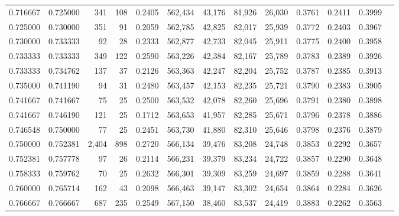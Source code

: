 \begin{tabular}{rrrrrrrrrrrrr}
0.716667 & 0.725000 &    341 &    108 &                                     0.2405 & 562,434 &  43,176 &  81,926 &  26,030 & 0.3761 & 0.2411 & 0.3999 \\
0.725000 & 0.730000 &    351 &     91 &                                     0.2059 & 562,785 &  42,825 &  82,017 &  25,939 & 0.3772 & 0.2403 & 0.3967 \\
0.730000 & 0.733333 &     92 &     28 &                                     0.2333 & 562,877 &  42,733 &  82,045 &  25,911 & 0.3775 & 0.2400 & 0.3958 \\
0.733333 & 0.733333 &    349 &    122 &                                     0.2590 & 563,226 &  42,384 &  82,167 &  25,789 & 0.3783 & 0.2389 & 0.3926 \\
0.733333 & 0.734762 &    137 &     37 &                                     0.2126 & 563,363 &  42,247 &  82,204 &  25,752 & 0.3787 & 0.2385 & 0.3913 \\
0.735000 & 0.741190 &     94 &     31 &                                     0.2480 & 563,457 &  42,153 &  82,235 &  25,721 & 0.3790 & 0.2383 & 0.3905 \\
0.741667 & 0.741667 &     75 &     25 &                                     0.2500 & 563,532 &  42,078 &  82,260 &  25,696 & 0.3791 & 0.2380 & 0.3898 \\
0.741667 & 0.746190 &    121 &     25 &                                     0.1712 & 563,653 &  41,957 &  82,285 &  25,671 & 0.3796 & 0.2378 & 0.3886 \\
0.746548 & 0.750000 &     77 &     25 &                                     0.2451 & 563,730 &  41,880 &  82,310 &  25,646 & 0.3798 & 0.2376 & 0.3879 \\
0.750000 & 0.752381 &  2,404 &    898 &                                     0.2720 & 566,134 &  39,476 &  83,208 &  24,748 & 0.3853 & 0.2292 & 0.3657 \\
0.752381 & 0.757778 &     97 &     26 &                                     0.2114 & 566,231 &  39,379 &  83,234 &  24,722 & 0.3857 & 0.2290 & 0.3648 \\
0.758333 & 0.759762 &     70 &     25 &                                     0.2632 & 566,301 &  39,309 &  83,259 &  24,697 & 0.3859 & 0.2288 & 0.3641 \\
0.760000 & 0.765714 &    162 &     43 &                                     0.2098 & 566,463 &  39,147 &  83,302 &  24,654 & 0.3864 & 0.2284 & 0.3626 \\
0.766667 & 0.766667 &    687 &    235 &                                     0.2549 & 567,150 &  38,460 &  83,537 &  24,419 & 0.3883 & 0.2262 & 0.3563 \\

\end{tabular}
